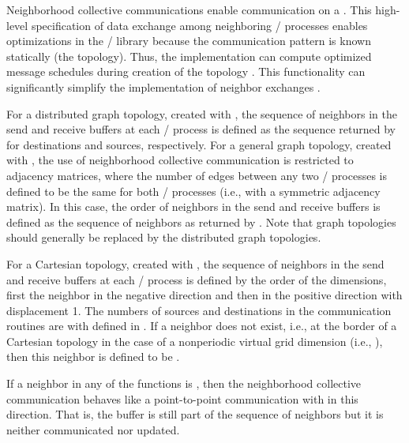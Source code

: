 \begin{rationale}
Neighborhood collective communications enable communication on a .
This high-level specification of data exchange among
neighboring \MPI/ processes enables optimizations in the \MPI/ library because
the communication pattern is known statically (the topology).
Thus, the implementation can compute optimized message schedules during
creation of the topology \cite{hoefler-sparsecolls-hips}. This
functionality can significantly simplify the implementation of neighbor
exchanges \cite{hoefler-europvm08-qm}.
\end{rationale}

For a distributed graph topology, created with
, the sequence of neighbors in the
send and receive buffers at each \MPI/ process is defined as the sequence
returned by  for destinations and
sources, respectively. For a general graph topology, created with
, the use of neighborhood collective
communication is restricted to adjacency matrices, where the number of
edges between any two \MPI/ processes is defined to be the same for both
\MPI/ processes (i.e., with a symmetric adjacency matrix). In this case,
the order of neighbors in the send and
receive buffers is defined as the sequence of neighbors as returned by
. Note that graph topologies
should generally be replaced by the distributed graph topologies.

For a Cartesian topology, created with , the
sequence of neighbors in the send and receive buffers at each \MPI/ process is
defined by the order of the dimensions, first the neighbor in the negative
direction and then in the positive direction with displacement 1.  The
numbers of sources and destinations in the communication routines are
 with  defined in
. If a neighbor does not exist, i.e., at the
border of a Cartesian topology in the case of a nonperiodic virtual
grid dimension (i.e., ), then this neighbor is
defined to be .

If a neighbor in any of the functions is , then
the neighborhood collective communication behaves like a point-to-point
communication with  in this direction. That is,
the buffer is still part of the sequence of neighbors but it is neither
communicated nor updated.  

